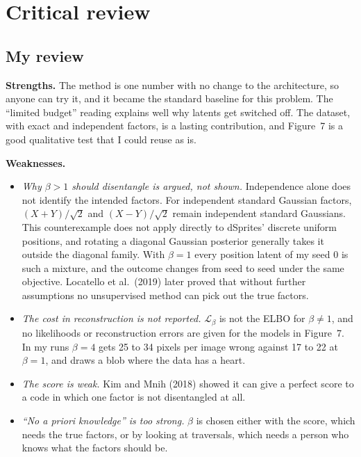 \section{Critical review}

\subsection{My review}
\textbf{Strengths.} The method is one number with no change to the architecture, so anyone can try it, and it became the standard baseline for this problem. The ``limited budget'' reading explains well why latents get switched off. The dataset, with exact and independent factors, is a lasting contribution, and Figure~7 is a good qualitative test that I could reuse as is.

\textbf{Weaknesses.}
\begin{itemize}
\item \emph{Why $\beta>1$ should disentangle is argued, not shown.} Independence alone does not identify the intended factors. For independent standard Gaussian factors, $(X+Y)/\sqrt{2}$ and $(X-Y)/\sqrt{2}$ remain independent standard Gaussians. This counterexample does not apply directly to dSprites' discrete uniform positions, and rotating a diagonal Gaussian posterior generally takes it outside the diagonal family. With $\beta=1$ every position latent of my seed 0 is such a mixture, and the outcome changes from seed to seed under the same objective. Locatello et al.\ (2019) later proved that without further assumptions no unsupervised method can pick out the true factors.
\item \emph{The cost in reconstruction is not reported.} $\mathcal L_\beta$ is not the ELBO for $\beta\ne1$, and no likelihoods or reconstruction errors are given for the models in Figure~7. In my runs $\beta=4$ gets 25 to 34 pixels per image wrong against 17 to 22 at $\beta=1$, and draws a blob where the data has a heart.
\item \emph{The score is weak.} Kim and Mnih (2018) showed it can give a perfect score to a code in which one factor is not disentangled at all.
\item \emph{``No a priori knowledge'' is too strong.} $\beta$ is chosen either with the score, which needs the true factors, or by looking at traversals, which needs a person who knows what the factors should be.
\end{itemize}

